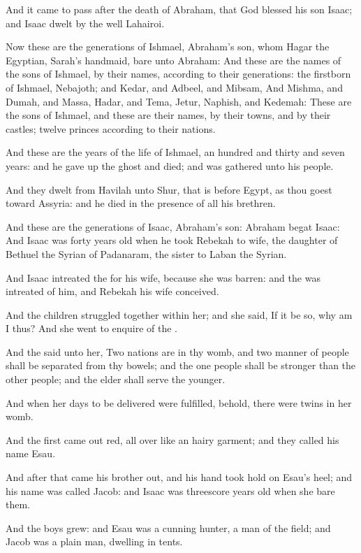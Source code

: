 \verse And it came to pass after the death of Abraham, that God blessed his son Isaac; and Isaac dwelt by the well Lahairoi.

\verse Now these are the generations of Ishmael, Abraham's son, whom Hagar the Egyptian, Sarah's handmaid, bare unto Abraham: \verse And these are the names of the sons of Ishmael, by their names, according to their generations: the firstborn of Ishmael, Nebajoth; and Kedar, and Adbeel, and Mibsam, \verse And Mishma, and Dumah, and Massa, \verse Hadar, and Tema, Jetur, Naphish, and Kedemah: \verse These are the sons of Ishmael, and these are their names, by their towns, and by their castles; twelve princes according to their nations.

\verse And these are the years of the life of Ishmael, an hundred and thirty and seven years: and he gave up the ghost and died; and was gathered unto his people.

\verse And they dwelt from Havilah unto Shur, that is before Egypt, as thou goest toward Assyria: and he died in the presence of all his brethren.

\verse And these are the generations of Isaac, Abraham's son: Abraham begat Isaac: \verse And Isaac was forty years old when he took Rebekah to wife, the daughter of Bethuel the Syrian of Padanaram, the sister to Laban the Syrian.

\verse And Isaac intreated the \LORD for his wife, because she was barren: and the \LORD was intreated of him, and Rebekah his wife conceived.

\verse And the children struggled together within her; and she said, If it be so, why am I thus? And she went to enquire of the \LORD.

\verse And the \LORD said unto her, Two nations are in thy womb, and two manner of people shall be separated from thy bowels; and the one people shall be stronger than the other people; and the elder shall serve the younger.

\verse And when her days to be delivered were fulfilled, behold, there were twins in her womb.

\verse And the first came out red, all over like an hairy garment; and they called his name Esau.

\verse And after that came his brother out, and his hand took hold on Esau's heel; and his name was called Jacob: and Isaac was threescore years old when she bare them.

\verse And the boys grew: and Esau was a cunning hunter, a man of the field; and Jacob was a plain man, dwelling in tents.

